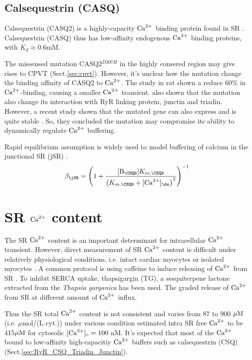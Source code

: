 \subsection{Calsequestrin (CASQ)}
\label{sec:calsequestrin}

Calsequestrin (CASQ2) is a highly-capacity ${\text{Ca}^{2+}}$ binding protein found in SR
\citep{beard2004}. Calsequestrin (CASQ) thus has low-affinity endogenous ${\text{Ca}^{2+}}$
binding proteins, with $K_d\approx 0.6$mM. 

The missensed mutation CASQ2$^{D307H}$ in the highly consered region may give
rises to CPVT \citep{Lahat2001} (Sect.\ref{sec:cpvt}). However, it's unclear how
the mutation change the binding affinity of CASQ2 to ${\text{Ca}^{2+}}$. The study in rat
shown a reduce 60\% in ${\text{Ca}^{2+}}$-binding, causing a smaller ${\text{Ca}^{2+}}$ transient. 
\citep{houle2004} also shown that the mutation also change its interaction with RyR
linking protein, junctin and triadin. However, a recent study shown that the
mutated gene can also express and is quite stable \citep{kalyanasundaram2010}.
So, they concluded the mutation may compromise its ability to dynamically
regulate ${\text{Ca}^{2+}}$ buffering. 

Rapid equilibrium assumption is widely used to model buffering of calcium in the
junctional SR (jSR) \citep{greenstein2002}.
\begin{equation}
\beta_\jSR = \left( 1 +
\frac{[\B_\CSQN]K_{m,\CSQN}}{\left(K_{m,\CSQN}+[\Ca]_\ds\right)^2} \right)^{-1}
\end{equation}

\section{SR ${\text{Ca}^{2+}}$ content}

The SR ${\text{Ca}^{2+}}$ content is an important determinant for intracellular ${\text{Ca}^{2+}}$
transient. However, direct measurement of SR ${\text{Ca}^{2+}}$ content is difficult under
relatively physiological conditions, i.e. intact cardiac myocytes or isolated
myocytes \citep{bers1991ecc}. A common protocol is using caffeine to induce
releasing of ${\text{Ca}^{2+}}$ from SR \citep{Bassani1993}. To inhibit SERCA uptake,
thapsigargin (TG), a sesquiterpene lactone extracted from the {\it Thapsia
garganica} has been used. The graded release of ${\text{Ca}^{2+}}$ from SR at different
amount of ${\text{Ca}^{2+}}$ influx.


Thus the SR total ${\text{Ca}^{2+}}$ content is not consistent and
varies from 87 to 900 ${\mu\text{M}}$ (i.e. $\mu$mol/(L cyt.)) under various condition
\citep{shannon1997} estimated intra SR free ${\text{Ca}^{2+}}$ to be 415${\mu\text{M}}$ for
cytosolic $[{\text{Ca}^{2+}}]_c = 100$ nM. It's expected that most of the ${\text{Ca}^{2+}}$ bound to low-affinity high-capacitiy ${\text{Ca}^{2+}}$
buffers such as calsequestrin (CSQ) (Sect.\ref{sec:RyR_CSQ_Triadin_Junctin}).

